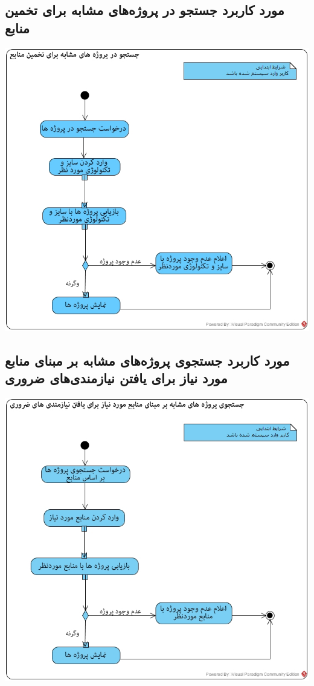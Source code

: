 \subsection*{مورد کاربرد جستجو در پروژه‌های مشابه برای تخمین منابع}
\vspace{2cm}
\begin{center}
\includegraphics[width=\textwidth]{ActivityDiagrams/44.jpg}
\end{center}

\newpage
\vspace{2cm}
\subsection*{مورد کاربرد جستجوی پروژه‌های مشابه بر مبنای منابع مورد نیاز برای یافتن نیازمندی‌های ضروری}
\vspace{2cm}
\begin{center}
\includegraphics[width=\textwidth]{ActivityDiagrams/45.jpg}
\end{center}